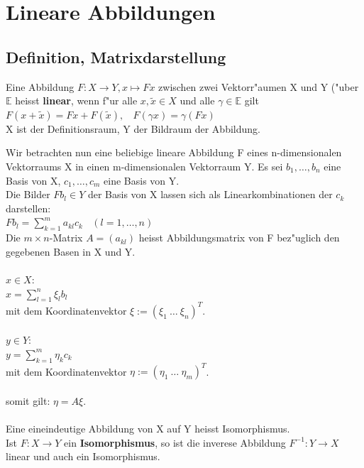 \documentclass[10pt, a4paper, twocolumn]{scrartcl}
\begin{document}
\section{Lineare Abbildungen}

\subsection{Definition, Matrixdarstellung}

Eine Abbildung $F:X\rightarrow Y, x \mapsto Fx$ zwischen zwei Vektorr"aumen X und Y ("uber $\mathbb{E}$ heisst {\bf linear}, wenn f"ur alle $x,\widetilde{x}\in X$ und alle $\gamma\in\mathbb{E}$ gilt\\
$F(x+\widetilde{x})=Fx+F(\widetilde{x}),\:\:\:\:F(\gamma x)=\gamma(Fx)$\\
X ist der Definitionsraum, Y der Bildraum der Abbildung.

Wir betrachten nun eine beliebige lineare Abbildung F eines n-dimensionalen Vektorraums X in einen m-dimensionalen Vektorraum Y. Es sei ${b_1,\ldots,b_n}$ eine Basis von X, ${c_1,\ldots,c_m}$ eine Basis von Y.\\
Die Bilder $Fb_l \in Y$ der Basis von X lassen sich als Linearkombinationen der $c_k$ darstellen:\\
$Fb_l=\sum^m_{k=1}a_{kl}c_k\:\:\:\:(l=1,\ldots,n)$\\
Die $m\times n$-Matrix $A=(a_{kl})$ heisst Abbildungsmatrix von F bez"uglich den gegebenen Basen in X und Y.\\\\

$x\in X$:\\
$x=\sum^n_{l=1}\xi_l b_l$\\
mit dem Koordinatenvektor $\xi:= (\xi_1\:\ldots\:\xi_n)^T$.\\\\

$y\in Y$:\\
$y=\sum^m_{k=1}\eta_k c_k$\\
mit dem Koordinatenvektor $\eta:= (\eta_1\:\ldots\:\eta_m)^T$.\\\\

somit gilt: $\eta=A\xi$.\\\\

Eine eineindeutige Abbildung von X auf Y heisst Isomorphismus.\\
Ist $F:X\rightarrow Y$ ein {\bf Isomorphismus}, so ist die inverese Abbildung $F^{-1}:Y\rightarrow X$ linear und auch ein Isomorphismus.\\
\end{document}
